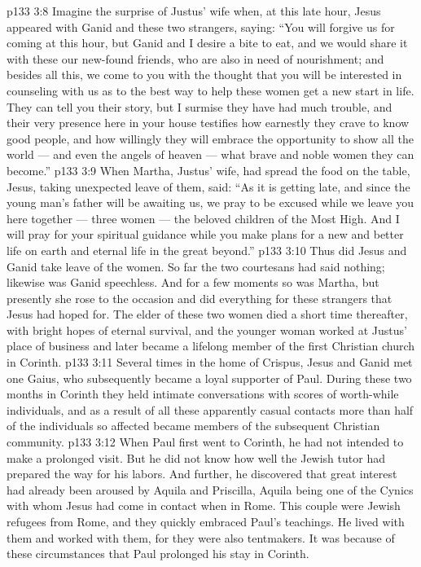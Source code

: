\vs p133 3:8 Imagine the surprise of Justus’ wife when, at this late hour, Jesus appeared with Ganid and these two strangers, saying: \textcolor{ubdarkred}{“You will forgive us for coming at this hour, but Ganid and I desire a bite to eat, and we would share it with these our new\hyp{}found friends, who are also in need of nourishment; and besides all this, we come to you with the thought that you will be interested in counseling with us as to the best way to help these women get a new start in life. They can tell you their story, but I surmise they have had much trouble, and their very presence here in your house testifies how earnestly they crave to know good people, and how willingly they will embrace the opportunity to show all the world --- and even the angels of heaven --- what brave and noble women they can become.”}
\vs p133 3:9 When Martha, Justus’ wife, had spread the food on the table, Jesus, taking unexpected leave of them, said: \textcolor{ubdarkred}{“As it is getting late, and since the young man’s father will be awaiting us, we pray to be excused while we leave you here together --- three women --- the beloved children of the Most High. And I will pray for your spiritual guidance while you make plans for a new and better life on earth and eternal life in the great beyond.”}
\vs p133 3:10 Thus did Jesus and Ganid take leave of the women. So far the two courtesans had said nothing; likewise was Ganid speechless. And for a few moments so was Martha, but presently she rose to the occasion and did everything for these strangers that Jesus had hoped for. The elder of these two women died a short time thereafter, with bright hopes of eternal survival, and the younger woman worked at Justus’ place of business and later became a lifelong member of the first Christian church in Corinth.
\vs p133 3:11 Several times in the home of Crispus, Jesus and Ganid met one Gaius, who subsequently became a loyal supporter of Paul. During these two months in Corinth they held intimate conversations with scores of worth\hyp{}while individuals, and as a result of all these apparently casual contacts more than half of the individuals so affected became members of the subsequent Christian community.
\vs p133 3:12 When Paul first went to Corinth, he had not intended to make a prolonged visit. But he did not know how well the Jewish tutor had prepared the way for his labors. And further, he discovered that great interest had already been aroused by Aquila and Priscilla, Aquila being one of the Cynics with whom Jesus had come in contact when in Rome. This couple were Jewish refugees from Rome, and they quickly embraced Paul’s teachings. He lived with them and worked with them, for they were also tentmakers. It was because of these circumstances that Paul prolonged his stay in Corinth.
